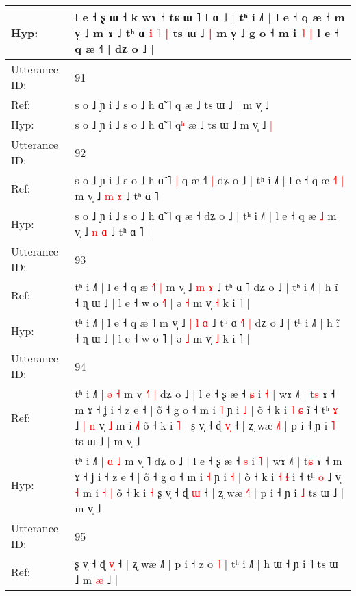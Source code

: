 \documentclass[10pt]{article}
\DeclareRobustCommand{\hl}[1]{{\textcolor{red}{#1}}}
\begin{document}
\begin{longtable}{ll}
 \\
Hyp: & l e ˧ ʂ ɯ ˧ k wɤ ˧ tɕ ɯ ˥ l ɑ ˩ | tʰ i ˩˥ | l e ˧ q æ ˧\hl{}\hl{}\hl{} m v̩ ˩ m ɤ ˩ tʰ ɑ\hl{ }\hl{i} ˥\hl{ }\hl{|} ts ɯ ˩\hl{ }\hl{|} m v̩ ˩\hl{}\hl{} g o ˧ m i\hl{ }\hl{˥} \hl{|} l e ˧ q æ ˧˥ | dʑ o ˩ |
 \\
\midrule
Utterance ID: & 91 \\
Ref: & s o ˩ ɲ i ˩ s o ˩ h ɑ̃ ˥ q\hl{} æ ˩ ts ɯ ˩\hl{ }\hl{|} m v̩ ˩\hl{}\hl{}
 \\
Hyp: & s o ˩ ɲ i ˩ s o ˩ h ɑ̃ ˥ q\hl{ʰ} æ ˩ ts ɯ ˩\hl{}\hl{} m v̩ ˩\hl{ }\hl{|}
 \\
\midrule
Utterance ID: & 92 \\
Ref: & s o ˩ ɲ i ˩ s o ˩ h ɑ̃ ˥\hl{ }\hl{|} q æ ˧\hl{˥}\hl{ }\hl{|} dʑ o ˩ | tʰ i ˩˥ | l e ˧ q æ\hl{ }\hl{˧}\hl{˥} \hl{|} m v̩ ˩ \hl{m} \hl{ɤ} ˩ tʰ ɑ ˥ |
 \\
Hyp: & s o ˩ ɲ i ˩ s o ˩ h ɑ̃ ˥\hl{}\hl{} q æ ˧\hl{}\hl{}\hl{} dʑ o ˩ | tʰ i ˩˥ | l e ˧ q æ\hl{}\hl{}\hl{} \hl{˩} m v̩ ˩ \hl{n} \hl{ɑ} ˩ tʰ ɑ ˥ |
 \\
\midrule
Utterance ID: & 93 \\
Ref: & tʰ i ˩˥ | l e ˧ q æ \hl{˧}˥\hl{ }\hl{|} m v̩ ˩\hl{}\hl{} \hl{m} \hl{ɤ} ˩ tʰ ɑ \hl{}˥\hl{}\hl{} dʑ o ˩ | tʰ i ˩˥ | h ĩ ˧ ɳ ɯ ˩ | l e ˧ w o \hl{˧}˥ | ə \hl{˧} m v̩ \hl{˧} k i ˥ |
 \\
Hyp: & tʰ i ˩˥ | l e ˧ q æ \hl{}˥\hl{}\hl{} m v̩ ˩\hl{ }\hl{|} \hl{l} \hl{ɑ} ˩ tʰ ɑ \hl{˧}˥\hl{ }\hl{|} dʑ o ˩ | tʰ i ˩˥ | h ĩ ˧ ɳ ɯ ˩ | l e ˧ w o \hl{}˥ | ə \hl{˩} m v̩ \hl{˩} k i ˥ |
 \\
\midrule
Utterance ID: & 94 \\
Ref: & tʰ i ˩˥ | \hl{ə} \hl{˧} m v̩ \hl{˧}˥\hl{ }\hl{|} dʑ o ˩ | l e ˧ ʂ æ ˧ \hl{ɕ} i \hl{˧} | wɤ ˩˥ | t\hl{s} ɤ ˧ m ɤ ˧ ʝ i ˧ z e ˧ | õ ˧ g o ˧ m i \hl{˥} ɲ i \hl{˩} | õ ˧ k i \hl{˥} \hl{ɕ} i\hl{̃} ˧ tʰ \hl{ɤ} ˩\hl{ }\hl{|}\hl{ }\hl{n} v̩ \hl{˩} m i \hl{}\hl{˩}\hl{˥} õ ˧ k i\hl{ }\hl{˥} \hl{|} ʂ v̩ ˧ ɖ \hl{v}\hl{̩} ˧ | ʐ wæ \hl{˩}˥ | p i ˧ ɲ i \hl{˥} ts ɯ ˩ | m v̩ ˩
 \\
Hyp: & tʰ i ˩˥ | \hl{ɑ} \hl{˩} m v̩ \hl{}˥\hl{}\hl{} dʑ o ˩ | l e ˧ ʂ æ ˧ \hl{s} i \hl{˥} | wɤ ˩˥ | t\hl{ɕ} ɤ ˧ m ɤ ˧ ʝ i ˧ z e ˧ | õ ˧ g o ˧ m i \hl{˧} ɲ i \hl{˧} | õ ˧ k i \hl{˧} \hl{ɬ} i\hl{} ˧ tʰ \hl{o} ˩\hl{}\hl{}\hl{}\hl{} v̩ \hl{˧} m i \hl{˧}\hl{ }\hl{|} õ ˧ k i\hl{}\hl{} \hl{˧} ʂ v̩ ˧ ɖ \hl{}\hl{ɯ} ˧ | ʐ wæ \hl{˧}˥ | p i ˧ ɲ i \hl{˩} ts ɯ ˩ | m v̩ ˩
 \\
\midrule
Utterance ID: & 95 \\
Ref: & ʂ v̩ ˧ ɖ \hl{v}\hl{̩} ˧ | ʐ wæ ˩˥ | p i ˧ z o \hl{˥} | tʰ i ˩˥ | h ɯ ˧ ɲ i ˥ ts ɯ ˩ m \hl{}\hl{æ} ˩ |

\end{longtable}
\end{document}
